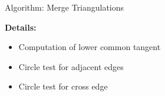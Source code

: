 \documentclass[aspectratio=169,fleqn]{beamer}
\begin{document}
\begin{frame}{Algorithm: Merge Triangulations}
\begin{mybox}
\begin{enumerate}
      \end{enumerate}
    \end{mybox}
    \onslide<+->
    \textbf{Details:}
    \begin{itemize}
      \item<+-> Computation of lower common tangent
      \item<+-> Circle test for adjacent edges
      \item<+-> Circle test for cross edge
    \end{itemize}
  \end{frame}


\end{document}

